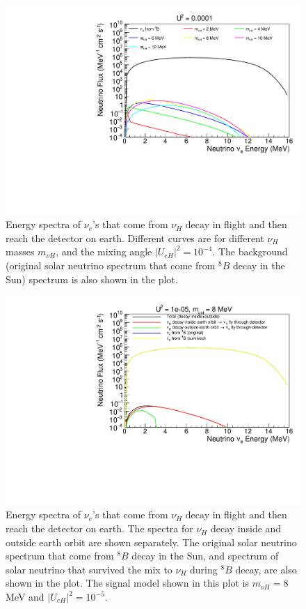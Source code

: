 \documentclass[%
 reprint,
 amsmath,amssymb,
 aps,
 prd,
floatfix,
twocolumn,
]{revtex4-1}
\begin{document}
\begin{figure}[!htbp]
\includegraphics[width=0.99\columnwidth]{../plots/DecayInFlightNuLEnergy_U0.0001_AllMass_linXlogY.pdf}
\caption{Energy spectra of $\nu_e$'s that come from $\nu_H$ decay in flight and then reach the detector on earth. Different curves are for different $\nu_H$ masses $m_{\nu H}$, and the mixing angle $|U_{eH}|^2 = 10^{-4}$. 
The background (original solar neutrino spectrum that come from $^8 B$ decay in the Sun) spectrum is also shown in the plot.}
\label{fig:DecayInFlightSpectrum_U1em4_AllMass}
\end{figure}

\begin{figure}[!htbp]
\includegraphics[width=0.99\columnwidth]{../plots/DecayInFlightNuLEnergy_U1e-05_M8.0_InsideOutside_linXlogY.pdf}
\caption{Energy spectra of $\nu_e$'s that come from $\nu_H$ decay in flight and then reach the detector on earth. The spectra for $\nu_H$ decay inside and outside earth orbit are shown separately. 
The original solar neutrino spectrum that come from $^8 B$ decay in the Sun, and spectrum of solar neutrino that survived the mix to $\nu_H$ during $^{8}B$ decay, are also shown in the plot. The signal model shown in this plot is $m_{\nu H} = 8$ MeV and $|U_{eH}|^2 = 10^{-5}$.}
\label{fig:DecayInFlightSpectrum_U1em5_M8} 
\end{figure}
\end{document}
